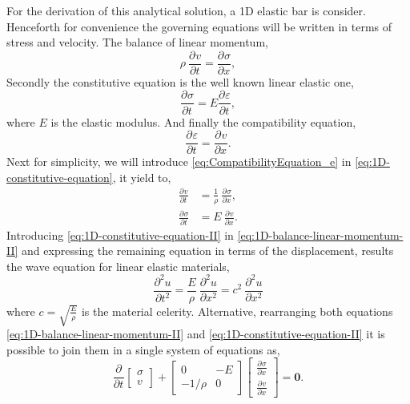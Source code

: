 \documentclass[preprint,12pt,a4paper]{elsarticle}
\newcommand{\Vector}[1]{
  \ensuremath{\mathbf{{#1}}}
}
\newcommand{\Deriv}[3][]{
  \ensuremath{\frac{\partial^{#1}{#2}}{ \partial {#3}^{#1} }}
}
\begin{document}
For the derivation of this analytical solution, a 1D elastic bar is
consider. Henceforth for convenience the governing equations will be written in terms of stress and velocity. The balance of linear momentum,
\begin{equation}
  \label{eq:1D-balance-linear-momentum}
  \rho\ \Deriv{v}{t} = \Deriv{\sigma}{x},
\end{equation}
Secondly the constitutive equation is the well known linear
elastic one,
\begin{equation}
  \label{eq:1D-constitutive-equation}
  \Deriv{\sigma}{t} = E \Deriv{\varepsilon}{t},
\end{equation}
where $E$ is the elastic modulus. And finally the compatibility
equation,
\begin{equation}
  \label{eq:CompatibilityEquation_e}
  \Deriv{\varepsilon}{t} = \Deriv{v}{x}.
\end{equation}
Next for simplicity, we will introduce
\eqref{eq:CompatibilityEquation_e} in
\eqref{eq:1D-constitutive-equation}, it yield to,
\begin{align}
  \label{eq:1D-balance-linear-momentum-II}
  \Deriv{v}{t} &= \frac{1}{\rho}\ \Deriv{\sigma}{x}, \\
  \label{eq:1D-constitutive-equation-II}
  \Deriv{\sigma}{t} &= E\ \Deriv{v}{x}.
\end{align}
Introducing \eqref{eq:1D-constitutive-equation-II} in
\eqref{eq:1D-balance-linear-momentum-II} and expressing the remaining equation in terms of the displacement, results the wave equation for linear elastic materials,
\begin{equation}
  \label{eq:1D-wave-elastic}
  \Deriv[2]{u}{t} = \frac{E}{\rho}\ \Deriv[2]{u}{x} = c^2\ \Deriv[2]{u}{x}
\end{equation}
where $c = \sqrt{\frac{E}{\rho}}$ is the material celerity. Alternative, rearranging both equations \eqref{eq:1D-balance-linear-momentum-II} and
\eqref{eq:1D-constitutive-equation-II} it is possible to join them in a single system of equations as,
\begin{equation}
  \label{eq:System-stress-velocity}
  \Deriv{}{t} \left[
    \begin{array}{c}
      \sigma \\
      v
    \end{array}
  \right] + \left[
    \begin{array}{cc}
      0 & - E \\
      - 1/\rho & 0 
    \end{array} \right] \left[
    \begin{array}{c}
      \Deriv{\sigma}{x} \\
      \Deriv{v}{x}
    \end{array}
  \right] = \Vector{0}.
\end{equation}
\end{document}
